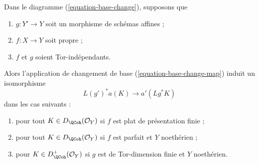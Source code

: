 \begin{lemma}
\label{lemma-more-base-change}
Dans le diagramme (\ref{equation-base-change}), supposons que
\begin{enumerate}
\item $g : Y' \to Y$ soit un morphisme de schémas affines ;
\item $f : X \to Y$ soit propre ;
\item $f$ et $g$ soient Tor-indépendants.
\end{enumerate}
Alors l'application de changement de base (\ref{equation-base-change-map}) induit un isomorphisme
$$
L(g')^*a(K) \longrightarrow a'(Lg^*K)
$$
dans les cas suivants :
\begin{enumerate}
\item pour tout $K \in D_\QCoh(\mathcal{O}_Y)$ si $f$ est plat de présentation finie ;
\item pour tout $K \in D_\QCoh(\mathcal{O}_Y)$ si $f$ est parfait et $Y$ noethérien ;
\item pour $K \in D_\QCoh^+(\mathcal{O}_Y)$ si $g$ est de Tor-dimension finie et $Y$ noethérien.
\end{enumerate}
\end{lemma}

